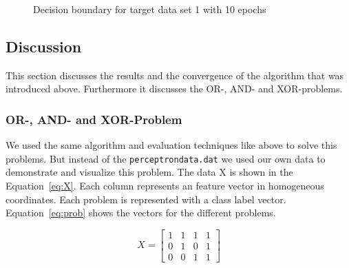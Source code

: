 \documentclass[subfigure,epsfig,fleqn,float,ausarbeitung]{scrartcl}
\begin{document}
\begin{figure}
	\centering
	\newlength\figureheight 
	\newlength\figurewidth 
	\setlength\figureheight{7cm} 
	\setlength\figurewidth{9cm}
	
	\caption{Decision boundary for target data set 1 with 10 epochs}
	\label{fig:decisionBoundary1}
\end{figure}

\begin{figure}
	\centering
	\setlength\figureheight{7cm} 
	\setlength\figurewidth{9cm}
	
	\caption{}
	\label{fig:decisionBoundary2}
\end{figure}

\begin{figure}
	\centering
	\setlength\figureheight{7cm} 
	\setlength\figurewidth{9cm}
	
	\caption{}
	\label{fig:decisionBoundary1100}
\end{figure}

\begin{figure}
	\centering
	\setlength\figureheight{7cm} 
	\setlength\figurewidth{9cm}
	
	\caption{}
	\label{fig:decisionBoundary2100}
\end{figure}



\subsection{Discussion}

This section discusses the results and the convergence of the algorithm that was introduced above. Furthermore it discusses the OR-, AND- and XOR-problems.

\subsubsection{OR-, AND- and XOR-Problem}

We used the same algorithm and evaluation techniques like above to solve this problems. But instead of the \texttt{perceptrondata.dat} we used our own data to demonstrate and visualize this problem. The data X is shown in the Equation~\ref{eq:X}. Each column represents an feature vector in homogeneous coordinates. Each problem is represented with a class label vector. Equation~\ref{eq:prob} shows the vectors for the different problems.

\begin{equation}
X = 
	\begin{bmatrix}
     1  &   1  &   1   &  1\\
     0  &   1  &   0   &  1\\
     0  &   0  &   1   &  1
	\end{bmatrix}
	\label{eq:X}
\end{equation}
\end{document}
